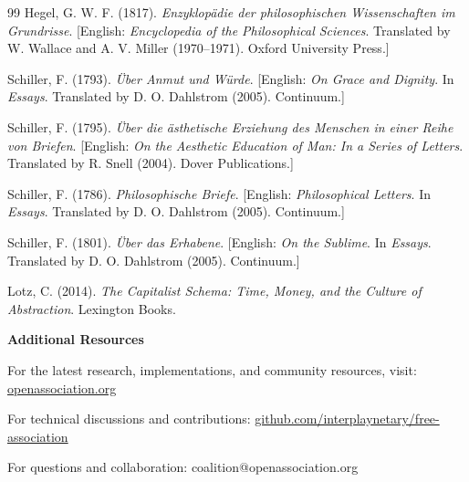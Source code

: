 \documentclass[11pt,a4paper]{article}
\theoremstyle{definition}
\theoremstyle{remark}
\begin{document}
\begin{thebibliography}{99}
Hegel, G. W. F. (1817). \textit{Enzyklop\"adie der philosophischen Wissenschaften im Grundrisse}. [English: \textit{Encyclopedia of the Philosophical Sciences}. Translated by W. Wallace and A. V. Miller (1970--1971). Oxford University Press.]

Schiller, F. (1793). \textit{\"Uber Anmut und W\"urde}. [English: \textit{On Grace and Dignity}. In \textit{Essays}. Translated by D. O. Dahlstrom (2005). Continuum.]

Schiller, F. (1795). \textit{\"Uber die \"asthetische Erziehung des Menschen in einer Reihe von Briefen}. [English: \textit{On the Aesthetic Education of Man: In a Series of Letters}. Translated by R. Snell (2004). Dover Publications.]

Schiller, F. (1786). \textit{Philosophische Briefe}. [English: \textit{Philosophical Letters}. In \textit{Essays}. Translated by D. O. Dahlstrom (2005). Continuum.]

Schiller, F. (1801). \textit{\"Uber das Erhabene}. [English: \textit{On the Sublime}. In \textit{Essays}. Translated by D. O. Dahlstrom (2005). Continuum.]

Lotz, C. (2014). \textit{The Capitalist Schema: Time, Money, and the Culture of Abstraction}. Lexington Books.

\end{thebibliography}

\vspace{1em}
\noindent\textbf{Additional Resources}

\noindent For the latest research, implementations, and community resources, visit: \url{openassociation.org}

\noindent For technical discussions and contributions: \url{github.com/interplaynetary/free-association}

\noindent For questions and collaboration: coalition@openassociation.org
\end{document}
